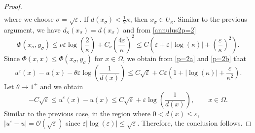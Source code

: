 \documentclass[11pt,reqno]{amsart}
\numberwithin{figure}{section}
\theoremstyle{plain}
\theoremstyle{remark}
\newtheorem{rem}{\bf{Remark}}
\numberwithin{equation}{section}
\begin{document}
\begin{proof}
\begin{align}
\end{align}
where we choose $\sigma = \sqrt{\varepsilon}$. If $d(x_\sigma)<\frac{1}{2}\kappa$, then $x_\sigma\in U_\kappa$. Similar to the previous argument, we have $d_\kappa(x_\sigma) = d(x_\sigma)$ and from \eqref{annulus2p=2}
\begin{equation}\label{p=2b}
    \Phi(x_\sigma,y_\sigma) \leq \nu\varepsilon \log\left(\frac{2}{\kappa}\right) + C_\nu\left(\frac{4\varepsilon}{\kappa}\right)^2 \leq C\left(\varepsilon+\varepsilon\,|\log(\kappa)| + \left(\frac{\varepsilon}{\kappa}\right)^2\right).
\end{equation}
Since $\Phi(x,x)\leq \Phi(x_\sigma,y_\sigma)$ for $x\in \Omega$, we obtain from \eqref{p=2a} and \eqref{p=2b} that
\begin{equation*}
    u^\varepsilon(x) - u(x) - \theta\varepsilon\log\left(\frac{1}{d(x)}\right) \leq C\sqrt{\varepsilon} +C\varepsilon \left(1+|\log(\kappa)| + \frac{\varepsilon}{\kappa^2}\right).
\end{equation*}
Let $\theta\to 1^+$ and we obtain 
\begin{equation*}
    -C\sqrt{\varepsilon}\leq u^\varepsilon(x) - u(x) \leq C\sqrt{\varepsilon} +  \varepsilon \log\left(\frac{1}{d(x)}\right), \qquad x\in \Omega.
\end{equation*}
Similar to the previous case, in the region where $0< d(x)\leq \varepsilon$, $|u^\varepsilon-u|=\mathcal{O}(\sqrt{\varepsilon})$ since $\varepsilon|\log(\varepsilon)|\leq \sqrt{\varepsilon}$. Therefore, the conclusion follows.
\end{proof}


\end{document}
